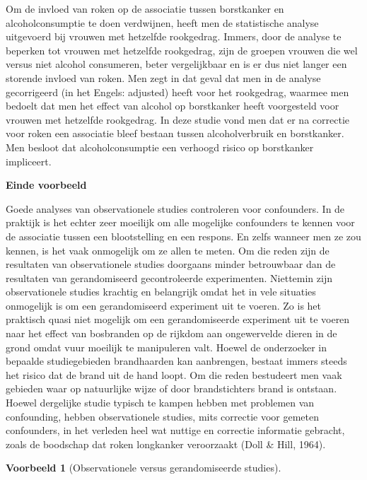 \documentclass[
  12pt,dutch,coursenotes]{book}
\theoremstyle{definition}
\theoremstyle{definition}
\newtheorem{example}{Voorbeeld}[chapter]
\theoremstyle{definition}
\theoremstyle{definition}
\theoremstyle{remark}
\begin{document}
Om de invloed van roken op de associatie tussen borstkanker en
alcoholconsumptie te doen verdwijnen, heeft men de statistische analyse
uitgevoerd bij vrouwen met hetzelfde rookgedrag. Immers, door de analyse te
beperken tot vrouwen met hetzelfde rookgedrag, zijn de groepen vrouwen die
wel versus niet alcohol consumeren, beter vergelijkbaar en is er dus niet
langer een storende invloed van roken. Men zegt in dat geval dat men in de
analyse gecorrigeerd (in het Engels: adjusted) heeft voor het
rookgedrag, waarmee men bedoelt dat men het effect van alcohol op
borstkanker heeft voorgesteld voor vrouwen met hetzelfde rookgedrag. In deze
studie vond men dat er na correctie voor roken een associatie bleef bestaan
tussen alcoholverbruik en borstkanker. Men besloot dat alcoholconsumptie een
verhoogd risico op borstkanker impliceert.

\textbf{Einde voorbeeld}

Goede analyses van observationele studies controleren voor confounders. In
de praktijk is het echter zeer moeilijk om alle mogelijke confounders te
kennen voor de associatie tussen een blootstelling en een respons. En zelfs
wanneer men ze zou kennen, is het vaak onmogelijk om ze allen te meten. Om
die reden zijn de resultaten van observationele studies doorgaans minder
betrouwbaar dan de resultaten van gerandomiseerd gecontroleerde
experimenten. Niettemin zijn observationele studies krachtig en belangrijk
omdat het in vele situaties onmogelijk is om een gerandomiseerd experiment
uit te voeren. Zo is het praktisch quasi niet mogelijk om een
gerandomiseerde experiment uit te voeren naar het effect van bosbranden op de rijkdom aan ongewervelde dieren in de grond omdat vuur moeilijk te manipuleren valt. Hoewel de onderzoeker in bepaalde studiegebieden brandhaarden kan aanbrengen, bestaat immers steeds het risico dat de brand uit de hand loopt. Om die reden bestudeert men vaak gebieden waar op natuurlijke wijze of door brandstichters brand is ontstaan. Hoewel dergelijke studie typisch te kampen hebben met problemen van confounding, hebben observationele studies, mits correctie
voor gemeten confounders, in het verleden heel wat nuttige en correctie informatie gebracht, zoals de boodschap dat roken longkanker veroorzaakt (Doll \& Hill, 1964).

\begin{example}[Observationele versus gerandomiseerde studies]
\protect\hypertarget{exm:unnamed-chunk-84}{}{\label{exm:unnamed-chunk-84} {} }
\end{example}
\end{document}
